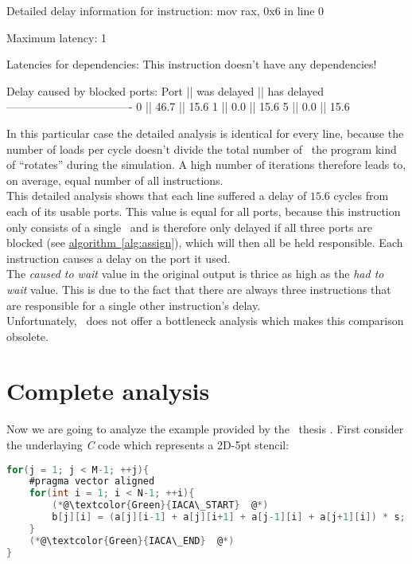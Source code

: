 \begin{example}
Detailed delay information for instruction: mov rax, 0x6 in line 0
    
            Maximum latency: 1
            
            Latencies for dependencies:
            This instruction doesn't have any dependencies!
                      
            Delay caused by blocked ports:
             Port || was delayed || has delayed
             ----------------------------------
              0   ||    46.7     ||    15.6
              1   ||     0.0     ||    15.6
              5   ||     0.0     ||    15.6
\end{example}

In this particular case the detailed analysis is identical for every line, because the number of loads per cycle doesn't divide the total number of \microops\ the program kind of ``rotates'' during the simulation. A high number of iterations therefore leads to, on average, equal number of all instructions.\\
This detailed analysis shows that each line suffered a delay of $15.6$ cycles from each of its usable ports. This value is equal for all ports, because this instruction only consists of a single \microop\ and is therefore only delayed if all three ports are blocked (see \hyperref[alg:assign]{algorithm~\ref*{alg:assign}}), which will then all be held responsible. Each instruction causes a delay on the port it used.\\
The \emph{caused to wait} value in the original output is thrice as high as the \emph{had to wait} value. This is due to the fact that there are always three instructions that are responsible for a single other instruction's delay.\\

Unfortunately, \osaca\ does not offer a bottleneck analysis which makes this comparison obsolete.


\section{Complete analysis}

Now we are going to analyze the example provided by the \osaca\ thesis \cite{osaca-thesis}. First consider the underlaying \emph{C} code which represents a 2D-5pt stencil:


\begin{mdframed}[backgroundcolor=light-gray, roundcorner=10pt,leftmargin=1, rightmargin=1, innerleftmargin=15, innertopmargin=1,innerbottommargin=1, outerlinewidth=1, linecolor=light-gray]
    \begin{lstlisting}[language=C, basicstyle=\scriptsize]
for(j = 1; j < M-1; ++j){
    #pragma vector aligned
    for(int i = 1; i < N-1; ++i){
        (*@\textcolor{Green}{IACA\_START}  @*)
        b[j][i] = (a[j][i-1] + a[j][i+1] + a[j-1][i] + a[j+1][i]) * s;
    }
    (*@\textcolor{Green}{IACA\_END}  @*)
}
    \end{lstlisting}
\end{mdframed}

